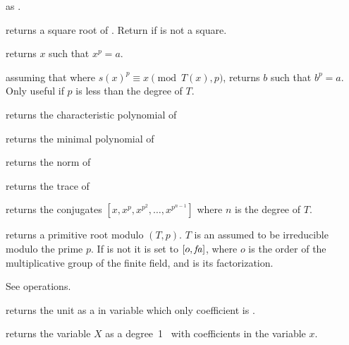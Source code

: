  as
.

 returns a square root of .
Return  if  is not a square.

 returns $x$ such that $x^p = a$.

 assuming that
 where $s(x)^p \equiv x\pmod{T(x),p}$,
returns $b$ such that $b^p=a$. Only useful if $p$ is less than the degree of
$T$.

 returns the characteristic
polynomial of 

 returns the minimal polynomial
of 

 returns the norm of 

 returns the trace of 

 returns the conjugates
$[x,x^p,x^{p^2},\ldots,x^{p^{n-1}}]$ where $n$ is the degree of $T$.

 returns a primitive root modulo
$(T,p)$. $T$ is an  assumed to be irreducible modulo the prime
$p$. If  is not  it is set to $[o,\hbox{\it fa\/}]$, where $o$ is the
order of the multiplicative group of the finite field, and  is
its factorization.

 See  operations.

 returns the unit  as a
 in variable  which only coefficient is .

 returns the variable $X$ as a
degree~1~ with  coefficients in the variable $x$.







